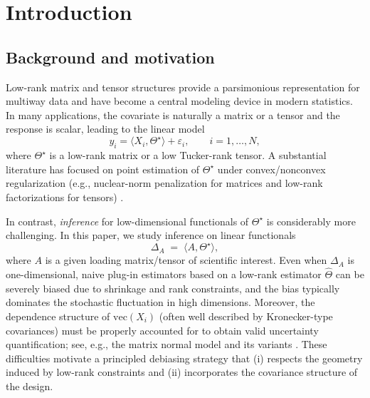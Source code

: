 \documentclass[authoryear,preprint,review,12pt]{elsarticle}
\begin{document}
	
	
	\section{Introduction}
	
	\subsection{Background and motivation}
	Low-rank matrix and tensor structures provide a parsimonious representation for multiway data and
	have become a central modeling device in modern statistics.
	In many applications, the covariate is naturally a matrix or a tensor and the response is scalar,
	leading to the linear model
	\begin{equation}\label{eq:model}
		y_i=\langle X_i,\Theta^\star\rangle+\varepsilon_i,\qquad i=1,\ldots,N,
	\end{equation}
	where $\Theta^\star$ is a low-rank matrix or a low Tucker-rank tensor.
	A substantial literature has focused on point estimation of $\Theta^\star$ under convex/nonconvex
	regularization (e.g., nuclear-norm penalization for matrices and low-rank factorizations for tensors)
	\citep{CandesRecht2009,NegahbanWainwright2011,KoldaBader2009,ZhouLiZhu2013}.
	
	In contrast, \emph{inference} for low-dimensional functionals of $\Theta^\star$ is considerably more
	challenging.
	In this paper, we study inference on linear functionals
	\begin{equation}\label{eq:target}
		\Delta_A \;=\;\langle A,\Theta^\star\rangle,
	\end{equation}
	where $A$ is a given loading matrix/tensor of scientific interest.
	Even when $\Delta_A$ is one-dimensional, naive plug-in estimators based on a low-rank estimator
	$\widehat\Theta$ can be severely biased due to shrinkage and rank constraints, and the bias typically
	dominates the stochastic fluctuation in high dimensions.
	Moreover, the dependence structure of $\mathrm{vec}(X_i)$ (often well described by Kronecker-type
	covariances) must be properly accounted for to obtain valid uncertainty quantification; see, e.g.,
	the matrix normal model and its variants \citep{Dutilleul1999}.
	These difficulties motivate a principled debiasing strategy that (i) respects the geometry induced
	by low-rank constraints and (ii) incorporates the covariance structure of the design.
	
\end{document}
